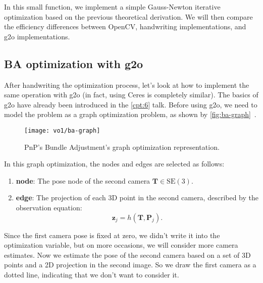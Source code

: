 In this small function, we implement a simple Gauss-Newton iterative optimization based on the previous theoretical derivation. We will then compare the efficiency differences between OpenCV, handwriting implementations, and g2o implementations.

\subsection{BA optimization with g2o}
After handwriting the optimization process, let's look at how to implement the same operation with g2o (in fact, using Ceres is completely similar). The basics of g2o have already been introduced in the \ref{cpt:6} talk. Before using g2o, we need to model the problem as a graph optimization problem, as shown by \autoref{fig:ba-graph}~.

\begin{figure}[!htp]
\centering
\texttt{[image: vo1/ba-graph]}
\caption{PnP's Bundle Adjustment's graph optimization representation. }
\label{fig:ba-graph}
\end{figure}

In this graph optimization, the nodes and edges are selected as follows:
\begin{enumerate}
\item \textbf{node}: The pose node of the second camera $\bm{T} \in \mathrm{SE}(3)$.
\item \textbf{edge}: The projection of each 3D point in the second camera, described by the observation equation:
\[
\bm{z}_j = h(\bm{T}, \bm{P}_{j}).
\]
\end{enumerate}

Since the first camera pose is fixed at zero, we didn't write it into the optimization variable, but on more occasions, we will consider more camera estimates. Now we estimate the pose of the second camera based on a set of 3D points and a 2D projection in the second image. So we draw the first camera as a dotted line, indicating that we don't want to consider it.

